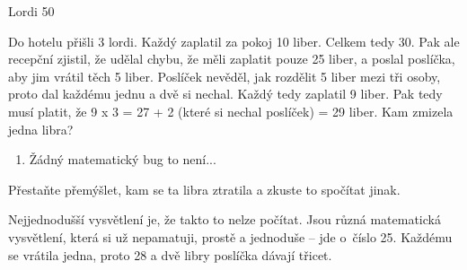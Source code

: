 Lordi
50 %

Do hotelu přišli 3 lordi. Každý zaplatil za pokoj 10 liber. Celkem tedy 30. Pak ale recepční zjistil, že udělal chybu, že měli zaplatit pouze 25 liber, a poslal poslíčka, aby jim vrátil těch 5 liber. Poslíček nevěděl, jak rozdělit 5 liber mezi tři osoby, proto dal každému jednu a dvě si nechal. Každý tedy zaplatil 9 liber.
Pak tedy musí platit, že 9 x 3 = 27 + 2 (které si nechal poslíček) = 29 liber. Kam zmizela jedna libra?

\begin{enumerate}
\item Žádný matematický bug to není...
\end{enumerate}

Přestaňte přemýšlet, kam se ta libra ztratila a zkuste to spočítat jinak.

Nejjednodušší vysvětlení je, že takto to nelze počítat. Jsou různá matematická vysvětlení, která si už nepamatuji, prostě a jednoduše – jde o~číslo 25. Každému se vrátila jedna, proto 28 a dvě libry poslíčka dávají třicet.
